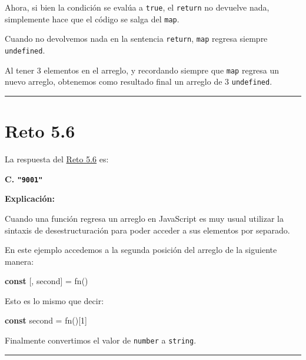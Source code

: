 \documentclass[
  letterpaper,
  DIV=11,
  numbers=noendperiod]{scrreprt}
\newenvironment{Shaded}{\begin{snugshade}}{\end{snugshade}}
\newcommand{\DecValTok}[1]{\textcolor[rgb]{0.68,0.00,0.00}{#1}}
\newcommand{\FunctionTok}[1]{\textcolor[rgb]{0.28,0.35,0.67}{#1}}
\newcommand{\KeywordTok}[1]{\textcolor[rgb]{0.00,0.23,0.31}{\textbf{#1}}}
\newcommand{\NormalTok}[1]{\textcolor[rgb]{0.00,0.23,0.31}{#1}}
\newcommand{\OperatorTok}[1]{\textcolor[rgb]{0.37,0.37,0.37}{#1}}
\begin{document}
Ahora, si bien la condición se evalúa a \texttt{true}, el
\texttt{return} no devuelve nada, simplemente hace que el código se
salga del \texttt{map}.

Cuando no devolvemos nada en la sentencia \texttt{return}, \texttt{map}
regresa siempre \texttt{undefined}.

Al tener 3 elementos en el arreglo, y recordando siempre que
\texttt{map} regresa un nuevo arreglo, obtenemos como resultado final un
arreglo de 3 \texttt{undefined}.

\begin{center}\rule{0.5\linewidth}{0.5pt}\end{center}

\section{Reto 5.6}\label{sec-sol-cap5-reto6}

La respuesta del \hyperref[sec-cap5-reto6]{Reto 5.6} es:

\textbf{C. \texttt{"9001"}}

\textbf{Explicación:}

Cuando una función regresa un arreglo en JavaScript es muy usual
utilizar la sintaxis de desestructuración para poder acceder a sus
elementos por separado.

En este ejemplo accedemos a la segunda posición del arreglo de la
siguiente manera:

\begin{Shaded}
\begin{Highlighting}[]
\KeywordTok{const}\NormalTok{ [}\OperatorTok{,}\NormalTok{ second] }\OperatorTok{=} \FunctionTok{fn}\NormalTok{()}
\end{Highlighting}
\end{Shaded}

Esto es lo mismo que decir:

\begin{Shaded}
\begin{Highlighting}[]
\KeywordTok{const}\NormalTok{ second }\OperatorTok{=} \FunctionTok{fn}\NormalTok{()[}\DecValTok{1}\NormalTok{]}
\end{Highlighting}
\end{Shaded}

Finalmente convertimos el valor de \texttt{number} a \texttt{string}.

\begin{center}\rule{0.5\linewidth}{0.5pt}\end{center}
\end{document}
